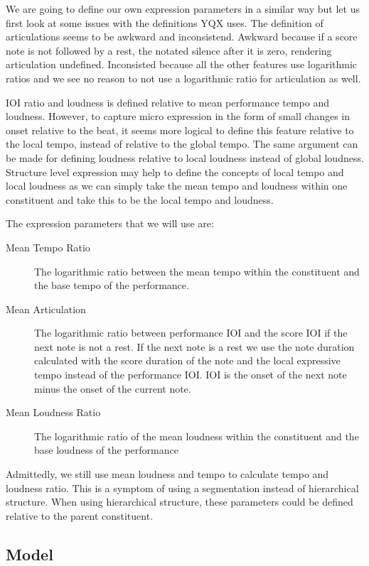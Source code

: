 \documentclass[a4paper,10pt]{article}
\begin{document}
We are going to define our own expression parameters in a similar way but let us first look at some issues with the definitions YQX uses. The definition of articulations seems to be awkward and inconsistend. Awkward because if a score note is not followed by a rest, the notated silence after it is zero, rendering articulation undefined. Inconsisted because all the other features use logarithmic ratios and we see no reason to not use a logarithmic ratio for articulation as well. 

IOI ratio and loudness is defined relative to mean performance tempo and loudness. However, to capture micro expression in the form of small changes in onset relative to the beat, it seems more logical to define this feature relative to the local tempo, instead of relative to the global tempo. The same argument can be made for defining loudness relative to local loudness instead of global loudness. Structure level expression may help to define the concepts of local tempo and local loudness as we can simply take the mean tempo and loudness within one constituent and take this to be the local tempo and loudness.

The expression parameters that we will use are:
\begin{description}
\item[Mean Tempo Ratio] The logarithmic ratio between the mean tempo within the constituent and the base tempo of the performance.
\item[Mean Articulation] The logarithmic ratio between performance IOI and the score IOI if the next note is not a rest. If the next note is a rest we use the note duration calculated with the score duration of the note and the local expressive tempo instead of the performance IOI. IOI is the onset of the next note minus the onset of the current note.
\item[Mean Loudness Ratio] The logarithmic ratio of the mean loudness within the constituent and the base loudness of the performance
\end{description}

Admittedly, we still use mean loudness and tempo to calculate tempo and loudness ratio. This is a symptom of using a segmentation instead of hierarchical structure. When using hierarchical structure, these parameters could be defined relative to the parent constituent.

\subsection{Model}
\end{document}
